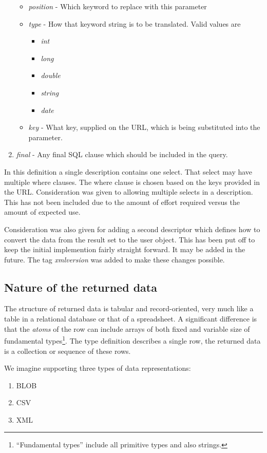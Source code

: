 \begin{enumerate}
\begin{itemize}
\item \emph{position} - Which keyword to replace with this parameter
\item \emph{type} - How that keyword string is to be translated.  Valid values are
\begin{itemize}
\item \emph{int}
\item \emph{long}
\item \emph{double}
\item \emph{string}
\item \emph{date}
\end{itemize}
\item \emph{key} - What key, supplied on the URL, which is being substituted into the parameter.
\end{itemize}
\item \emph{final} - Any final SQL clause which should be included in the query.

\end{enumerate}

In this definition a single description contains one select.  That select may have multiple where
clauses.  The where clause is chosen based on the keys provided in the URL.  Consideration was given
to allowing multiple selects in a description.  This has not been included due to the amount of 
effort required versus the amount of expected use.  

Consideration was also given for adding a second descriptor which defines how to convert the data
from the result set to the user object.  This has been put off to keep the initial implemention
fairly straight forward.  It may be added in the future.  The tag \emph{xmlversion} was added to 
make these changes possible.


\subsection{Nature of the returned data}

The structure of returned data is tabular and
record-oriented, very much like a table in a relational database or that
of a spreadsheet.
A significant difference is that the \emph{atoms} of the row can include
arrays of both fixed and variable size of fundamental \cpp
types\footnote{``Fundamental types'' include all primitive types and
also strings.}.  The type definition describes a single row, the
returned data is a collection or sequence of these rows.

We imagine supporting three types of data representations:
\begin{enumerate}
\item BLOB
\item CSV
\item XML
\end{enumerate}

